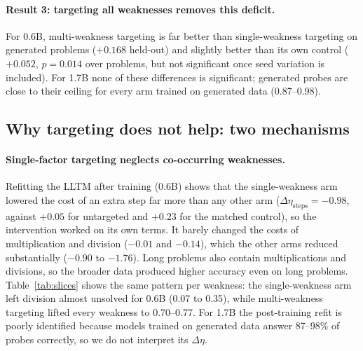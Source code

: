 \documentclass[11pt]{article}
\begin{document}
\paragraph{Result 3: targeting all weaknesses removes this deficit.} For 0.6B, multi-weakness targeting is far better
than single-weakness targeting on generated problems ($+0.168$ held-out) and slightly better than its own control
($+0.052$, $p=0.014$ over problems, but not significant once seed variation is included). For 1.7B none of these differences is significant; generated probes are close to their ceiling for
every arm trained on generated data (0.87--0.98).

\subsection{Why targeting does not help: two mechanisms}

\paragraph{Single-factor targeting neglects co-occurring weaknesses.}
Refitting the LLTM after training (0.6B) shows that the single-weakness arm lowered the cost of an extra step far more
than any other arm ($\Delta\eta_{\text{steps}} = -0.98$, against $+0.05$ for untargeted and $+0.23$ for the matched
control), so the intervention worked on its own terms. It barely changed the costs of multiplication and division
($-0.01$ and $-0.14$), which the other arms reduced substantially ($-0.90$ to $-1.76$). Long problems also contain
multiplications and divisions, so the broader data produced higher accuracy even on long problems. Table~\ref{tab:slices}
shows the same pattern per weakness: the single-weakness arm left division almost unsolved for 0.6B (0.07 to 0.35),
while multi-weakness targeting lifted every weakness to 0.70--0.77. For 1.7B the post-training refit is poorly
identified because models trained on generated data answer 87--98\% of probes correctly, so we do not interpret its $\Delta\eta$.
\end{document}
